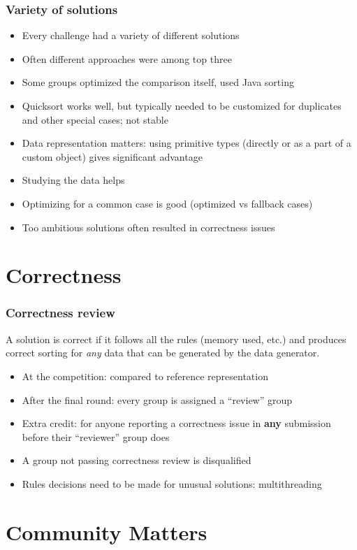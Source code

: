 \documentclass{beamer}
\begin{document}
\begin{frame}
\frametitle{Variety of solutions}
\begin{itemize}
\item Every challenge had a variety of different solutions
\item Often different approaches were among top three
\item Some groups optimized the comparison itself, used Java sorting
\item Quicksort works well, but typically needed to be customized for duplicates and other special cases; not stable
\item Data representation matters: using primitive types (directly or as a part of a custom object) gives significant advantage
\item Studying the data helps
\item Optimizing for a common case is good (optimized vs fallback cases)
\item Too ambitious solutions often resulted in correctness issues
\end{itemize}
\end{frame}

\section{Correctness}

\begin{frame}
\frametitle{Correctness review}
A solution is correct if it follows all the rules (memory used, etc.) and produces correct sorting for \textit{any} 
data that can be generated by the data generator.  
\begin{itemize}
\item At the competition: compared to reference representation
\item After the final round: every group is assigned a ``review'' group
\item Extra credit: for anyone reporting a correctness issue in \textbf{any} submission before their ``reviewer'' group does
\item A group not passing correctness review is disqualified
\item Rules decisions need to be made for unusual solutions: multithreading
\end{itemize}
\end{frame}

\section{Community Matters}
\end{document}

